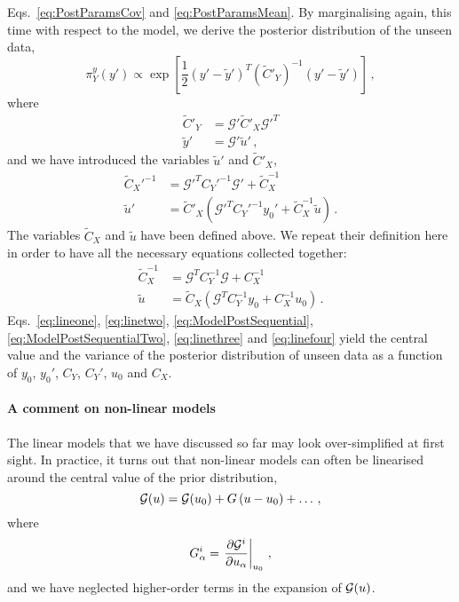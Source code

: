 Eqs.~\ref{eq:PostParamsCov} and \ref{eq:PostParamsMean}. By marginalising again,
this time with respect to the model, we derive the posterior distribution of the
unseen data,
\begin{equation}
  \label{eq:MarginaliseModelU}
  \pi^y_{Y}(y') \propto 
  \exp \left[ 
   \frac12 \left(y' - \tilde{y}'\right)^T
   (\tilde{C}'_{Y})^{-1} 
   \left(y' - \tilde{y}'\right)
   \right]\, ,
\end{equation}
where
\begin{align}
  \label{eq:lineone}
  \tilde{C}'_{Y} 
  &= \mathcal{G}' \tilde{C}'_{X} \mathcal{G}'^{T} \\
  \label{eq:linetwo}
  \tilde{y}'
  &= \mathcal{G}' \tilde{u}'\, ,
\end{align}
and we have introduced the variables $\tilde{u}'$ and $\tilde{C}'_{X}$,  
\begin{align}
  \label{eq:ModelPostSequential}
  \tilde{C}_{X}'^{-1} 
  &= \mathcal{G}'^T C_{Y}'^{-1} \mathcal{G}' + \tilde{C}_{X}^{-1} \\
  \label{eq:ModelPostSequentialTwo}
  \tilde{u}' 
  &= \tilde{C}'_{X} \left(
    \mathcal{G}'^T C_{Y}'^{-1} y_0' + \tilde{C}_{X}^{-1} \tilde{u} 
    \right) \, .
\end{align}
The variables $\tilde{C}_{X}$ and $\tilde{u}$ have been defined above. We repeat
their definition here in order to have all the necessary equations collected
together: 
\begin{align}
  \label{eq:linethree}
  \tilde{C}_{X}^{-1}
  &= \mathcal{G}^T C_{Y}^{-1} \mathcal{G} + C_{X}^{-1} \\
  \label{eq:linefour}
  \tilde{u}
  &= \tilde{C}_{X} \left(
    \mathcal{G}^T C_{Y}^{-1} y_0 + C_{X}^{-1} u_0
  \right)\, .
\end{align}
Eqs.~\ref{eq:lineone}, \ref{eq:linetwo}, \ref{eq:ModelPostSequential},
\ref{eq:ModelPostSequentialTwo}, \ref{eq:linethree} and \ref{eq:linefour} yield
the central value and the variance of the posterior distribution of unseen data
as a function of $y_0$, $y_0'$, $C_Y$, $C_Y'$, $u_0$ and $C_X$. 

\paragraph{A comment on non-linear models}

The linear models that we have discussed so far may look over-simplified at
first sight. In practice, it turns out that non-linear models can often be
linearised around the central value of the prior distribution, 
\begin{equation}
  \label{eq:LinU0}
  \mathcal{G}(u) = \mathcal{G}(u_0) + G \left(u - u_0\right) + \ldots\, ,
\end{equation}
where 
\begin{equation}
  \label{eq:FirstDerU0}
  G^i_\alpha = \left. \frac{\partial \mathcal{G}^i}{\partial u_\alpha} \right|_{u_0}\, ,
\end{equation}
and we have neglected higher-order terms in the expansion of
$\mathcal{G}(u)$.

